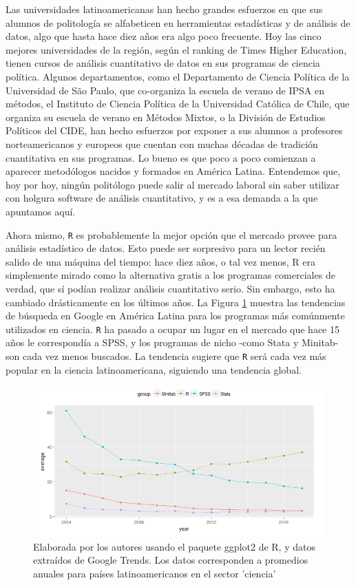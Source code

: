 \documentclass[]{book}
\begin{document}
Las universidades latinoamericanas han hecho grandes esfuerzos en que
sus alumnos de politología se alfabeticen en herramientas estadísticas y
de análisis de datos, algo que hasta hace diez años era algo poco
frecuente. Hoy las cinco mejores universidades de la región, según el
ranking de Times Higher Education, tienen cursos de análisis
cuantitativo de datos en sus programas de ciencia política. Algunos
departamentos, como el Departamento de Ciencia Política de la
Universidad de São Paulo, que co-organiza la escuela de verano de IPSA
en métodos, el Instituto de Ciencia Política de la Universidad Católica
de Chile, que organiza su escuela de verano en Métodos Mixtos, o la
División de Estudios Políticos del CIDE, han hecho esfuerzos por exponer
a sus alumnos a profesores norteamericanos y europeos que cuentan con
muchas décadas de tradición cuantitativa en sus programas. Lo bueno es
que poco a poco comienzan a aparecer metodólogos nacidos y formados en
América Latina. Entendemos que, hoy por hoy, ningún politólogo puede
salir al mercado laboral sin saber utilizar con holgura software de
análisis cuantitativo, y es a esa demanda a la que apuntamos aquí.

Ahora mismo, \texttt{R} es probablemente la mejor opción que el mercado
provee para análisis estadístico de datos. Esto puede ser sorpresivo
para un lector recién salido de una máquina del tiempo: hace diez años,
o tal vez menos, R era simplemente mirado como la alternativa gratis a
los programas comerciales de verdad, que sí podían realizar análisis
cuantitativo serio. Sin embargo, esto ha cambiado drásticamente en los
últimos años. La Figura \ref{fig:pref-gtrends} muestra las tendencias de
búsqueda en Google en América Latina para los programas más comúnmente
utilizados en ciencia. \texttt{R} ha pasado a ocupar un lugar en el
mercado que hace 15 años le correspondía a SPSS, y los programas de
nicho -como Stata y Minitab- son cada vez menos buscados. La tendencia
sugiere que \texttt{R} será cada vez más popular en la ciencia
latinoamericana, siguiendo una tendencia global.

\begin{figure}

{\centering \includegraphics[width=1\linewidth]{00-images/pref-gtrends} 

}

\caption{Elaborada por los autores usando el paquete ggplot2 de R, y datos extraídos de Google Trends. Los datos corresponden a promedios anuales para países latinoamericanos en el sector 'ciencia'}\label{fig:pref-gtrends}
\end{figure}
\end{document}
